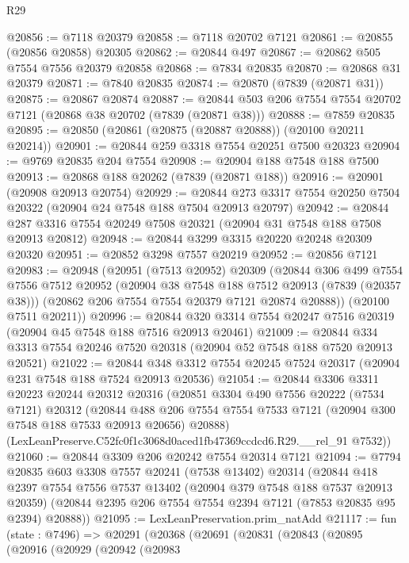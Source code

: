 \begin{lexlean}{R29}
\begin{coremodule}
@20856 := @7118 @20379
@20858 := @7118 @20702 @7121
@20861 := @20855 (@20856 @20858) @20305
@20862 := @20844 @497
@20867 := @20862 @505 @7554 @7556 @20379 @20858
@20868 := @7834 @20835
@20870 := @20868 @31 @20379
@20871 := @7840 @20835
@20874 := @20870 (@7839 (@20871 @31))
@20875 := @20867 @20874
@20887 := @20844 @503 @206 @7554 @7554 @20702 @7121 (@20868 @38 @20702 (@7839 (@20871 @38)))
@20888 := @7859 @20835
@20895 := @20850 (@20861 (@20875 (@20887 @20888)) (@20100 @20211 @20214))
@20901 := @20844 @259 @3318 @7554 @20251 @7500 @20323
@20904 := @9769 @20835 @204 @7554
@20908 := @20904 @188 @7548 @188 @7500
@20913 := @20868 @188 @20262 (@7839 (@20871 @188))
@20916 := @20901 (@20908 @20913 @20754)
@20929 := @20844 @273 @3317 @7554 @20250 @7504 @20322 (@20904 @24 @7548 @188 @7504 @20913 @20797)
@20942 := @20844 @287 @3316 @7554 @20249 @7508 @20321 (@20904 @31 @7548 @188 @7508 @20913 @20812)
@20948 := @20844 @3299 @3315 @20220 @20248 @20309 @20320
@20951 := @20852 @3298 @7557 @20219
@20952 := @20856 @7121
@20983 := @20948
    (@20951
      (@7513 @20952)
      @20309
      (@20844
        @306
        @499
        @7554
        @7556
        @7512
        @20952
        (@20904 @38 @7548 @188 @7512 @20913 (@7839 (@20357 @38)))
        (@20862 @206 @7554 @7554 @20379 @7121 @20874 @20888))
      (@20100 @7511 @20211))
@20996 := @20844 @320 @3314 @7554 @20247 @7516 @20319 (@20904 @45 @7548 @188 @7516 @20913 @20461)
@21009 := @20844 @334 @3313 @7554 @20246 @7520 @20318 (@20904 @52 @7548 @188 @7520 @20913 @20521)
@21022 := @20844 @348 @3312 @7554 @20245 @7524 @20317 (@20904 @231 @7548 @188 @7524 @20913 @20536)
@21054 := @20844
    @3306
    @3311
    @20223
    @20244
    @20312
    @20316
    (@20851
      @3304
      @490
      @7556
      @20222
      (@7534 @7121)
      @20312
      (@20844 @488 @206 @7554 @7554 @7533 @7121 (@20904 @300 @7548 @188 @7533 @20913 @20656) @20888)
      (LexLeanPreserve.C52fc0f1c3068d0aced1fb47369ccdcd6.R29.__rel_91 @7532))
@21060 := @20844 @3309 @206 @20242 @7554 @20314 @7121
@21094 := @7794
    @20835
    @603
    @3308
    @7557
    @20241
    (@7538 @13402)
    @20314
    (@20844
      @418
      @2397
      @7554
      @7556
      @7537
      @13402
      (@20904 @379 @7548 @188 @7537 @20913 @20359)
      (@20844 @2395 @206 @7554 @7554 @2394 @7121 (@7853 @20835 @95 @2394) @20888))
@21095 := LexLeanPreservation.prim_natAdd
@21117 := fun (state : @7496) =>
  @20291
    (@20368
      (@20691
        (@20831
          (@20843
            (@20895
              (@20916
                (@20929
                  (@20942
                    (@20983

\end{coremodule}
\end{lexlean}
